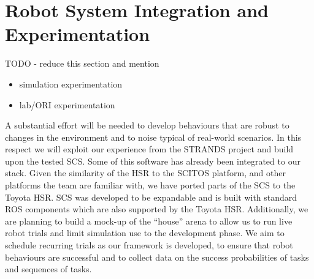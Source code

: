 \documentclass[runningheads,a4paper]{llncs}
\begin{document}
\section{Robot System Integration and Experimentation}
TODO - reduce this section and mention
\begin{itemize}
	\item simulation experimentation
	\item lab/ORI experimentation
\end{itemize}

A substantial effort will be needed to develop behaviours that are robust to
changes in the environment and to noise typical of real-world scenarios. In this
respect we will exploit our experience from the STRANDS project 
\cite{strands@ram} and build upon the tested SCS. Some of this software has already been integrated to our stack.
Given the similarity of the HSR to the SCITOS platform, and other platforms the team are familiar with, %
we have ported parts of the
SCS to the Toyota HSR. SCS was developed to be 
expandable and is built with standard ROS components which are also supported 
by the Toyota HSR. 
Additionally, we are planning to build a mock-up of the ``house'' arena to
allow us to run live robot trials and limit simulation use to the development
phase. We aim to schedule recurring trials as our framework is developed, to
ensure that robot behaviours are successful and to collect data on the 
success probabilities of tasks and sequences of tasks.
\end{document}
